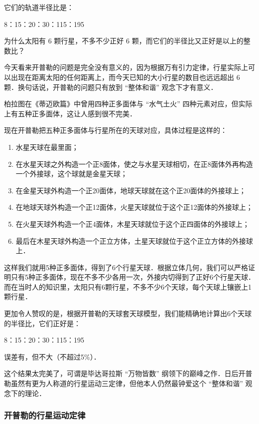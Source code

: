 它们的轨道半径比是：

8：15：20：30：115：195

为什么太阳有 6 颗行星，不多不少正好 6 颗，而它们的半径比又正好是以上的整数比？

今天看来开普勒的问题是完全没有意义的，因为根据万有引力定律，行星实际上可以出现在距离太阳的任何距离上，而今天已知的大小行星的数目也远远超出 6 颗．换句话说，开普勒的问题只有放到 “整体和谐” 观念下才有意义．

柏拉图在《蒂迈欧篇》中曾用四种正多面体与 “水气土火” 四种元素对应，但实际上有五种正多面体，这让人感到很不完美．

现在开普勒把五种正多面体与行星所在的天球对应，具体过程是这样的：

\begin{enumerate}
\item 水星天球在最里面；

\item 在水星天球之外构造一个正8面体，使之与水星天球相切，在正8面体外再构造一个外接球，这个球就是金星天球；

\item 在金星天球外构造一个正20面体，地球天球就在这个正20面体的外接球上；

\item 在地球天球外构造一个正12面体，火星天球就位于这个正12面体的外接球上；

\item 在火星天球外构造一个正4面体，木星天球就位于这个正四面体的外接球上；

\item 最后在木星天球外构造一个正立方体，土星天球就位于这个正立方体的外接球上．
\end{enumerate}

这样我们就用5种正多面体，得到了6个行星天球．根据立体几何，我们可以严格证明只有5种正多面体，现在不多不少各用一次，外接内切得到了正好6个行星天球．而在当时人的知识里，太阳只有6颗行星，不多不少6个天球，每个天球上镶嵌上1颗行星．

更加令人赞叹的是，根据开普勒的天球套天球模型，我们能精确地计算出6个天球的半径比，它们正好是：

8：15：20：30：115：195

误差有，但不大（不超过5\%）．

这个结果太完美了，可谓是毕达哥拉斯 “万物皆数” 纲领下的巅峰之作．日后开普勒虽然有更为人称道的行星运动三定律，但他本人仍然最钟爱这个 “整体和谐” 观念下的理论．


\subsubsection{开普勒的行星运动定律}

